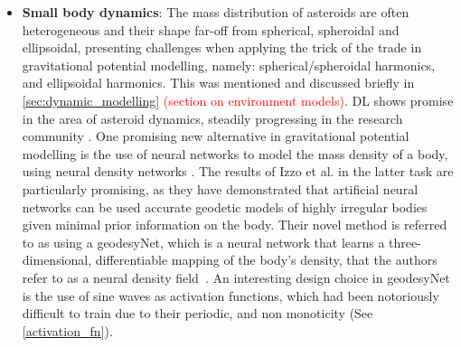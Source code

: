 \begin{itemize}
    \item \textbf{Small body dynamics}: The mass distribution of asteroids are
           often heterogeneous and their shape far-off from spherical,
           spheroidal and ellipsoidal, presenting challenges when applying the
           trick of the trade in gravitational potential modelling, namely:
           spherical/spheroidal harmonics, and ellipsoidal harmonics. This
           was mentioned and discussed briefly in \autoref{sec:dynamic_modelling}
           \textcolor{red}{(section on environment models)}. \gls{DL} shows promise
           in the area of asteroid dynamics, steadily progressing in the
           research community \cite{carruba2022machine}. One promising new
           alternative in gravitational potential modelling is the use of
           neural networks to model the mass density of a body, using neural
           density networks \cite{DBLP:journals/corr/abs-1802-00121}. The
           results of Izzo et al. in the latter task are particularly promising,
           as they have demonstrated that artificial neural networks can be used
           accurate geodetic models of highly irregular bodies given minimal
           prior information on the body. Their novel method is referred to as
           using a geodesyNet, which is a neural network that learns a
           three-dimensional, differentiable mapping of the body's density, that
           the authors refer to as a neural density
           field~\cite{IzzoGeodesyNet2021}. An interesting design choice in
           geodesyNet is the use of sine waves as activation functions, which
           had been notoriously difficult to train due to their periodic, and
           non monoticity (See \autoref{activation_fn}).

%

%


\end{itemize}
